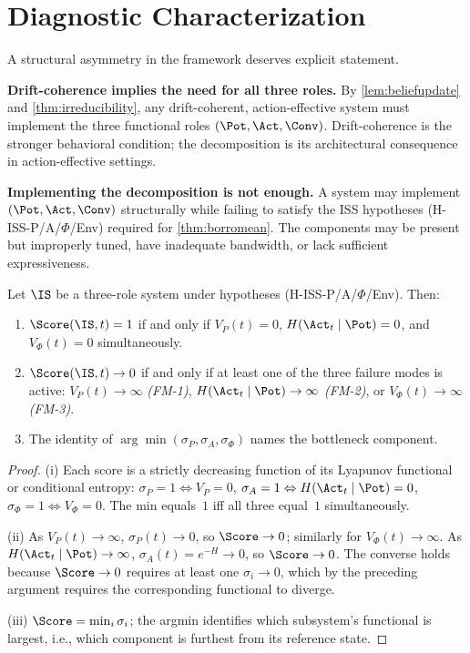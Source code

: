 \section{Diagnostic Characterization}\label{sec:diagnostic_characterization}

A structural asymmetry in the framework deserves explicit statement.

\textbf{Drift-coherence implies the need for all three roles.}
By \cref{lem:beliefupdate} and \cref{thm:irreducibility}, any
drift-coherent, action-effective system must implement the three
functional roles $(\Pot, \Act, \Conv)$. Drift-coherence is the stronger
behavioral condition; the decomposition is its architectural consequence in
action-effective settings.

\textbf{Implementing the decomposition is not enough.}
A system may implement $(\Pot, \Act, \Conv)$ structurally while failing
to satisfy the ISS hypotheses (H-ISS-P/A/$\Phi$/Env) required for
\cref{thm:borromean}. The components may be present but improperly tuned,
have inadequate bandwidth, or lack sufficient expressiveness.

\begin{proposition}\label{prop:tci_characterization}
Let $\IS$ be a three-role system under hypotheses
(H-ISS-P/A/$\Phi$/Env). Then:
\begin{enumerate}[label=\textnormal{(\roman*)}]
  \item $\Score(\IS,t) = 1$ if and only if $V_P(t)=0$,
    $H(\Act_t\mid\Pot)=0$, and $V_\Phi(t)=0$ simultaneously.
  \item $\Score(\IS,t)\to 0$ if and only if at least one of the
    three failure modes is active:
    $V_P(t)\to\infty$ \emph{(FM-1)},
    $H(\Act_t\mid\Pot)\to\infty$ \emph{(FM-2)}, or
    $V_\Phi(t)\to\infty$ \emph{(FM-3)}.
  \item The identity of $\arg\min(\sigma_P, \sigma_A, \sigma_\Phi)$
    names the bottleneck component.
\end{enumerate}
\end{proposition}

\begin{proof}
(i) Each score is a strictly decreasing function of its Lyapunov functional or
conditional entropy: $\sigma_P=1\Leftrightarrow V_P=0$,
$\sigma_A=1\Leftrightarrow H(\Act_t\mid\Pot)=0$,
$\sigma_\Phi=1\Leftrightarrow V_\Phi=0$.
The min equals~$1$ iff all three equal~$1$ simultaneously.

(ii) As $V_P(t)\to\infty$, $\sigma_P(t)\to 0$, so $\Score\to 0$;
similarly for $V_\Phi(t)\to\infty$.
As $H(\Act_t\mid\Pot)\to\infty$, $\sigma_A(t)=e^{-H}\to 0$, so
$\Score\to 0$.
The converse holds because $\Score\to 0$ requires at least one
$\sigma_i\to 0$, which by the preceding argument requires the corresponding
functional to diverge.

(iii) $\Score = \min_i \sigma_i$; the argmin identifies which
subsystem's functional is largest, i.e., which component is furthest from its
reference state.
\end{proof}

